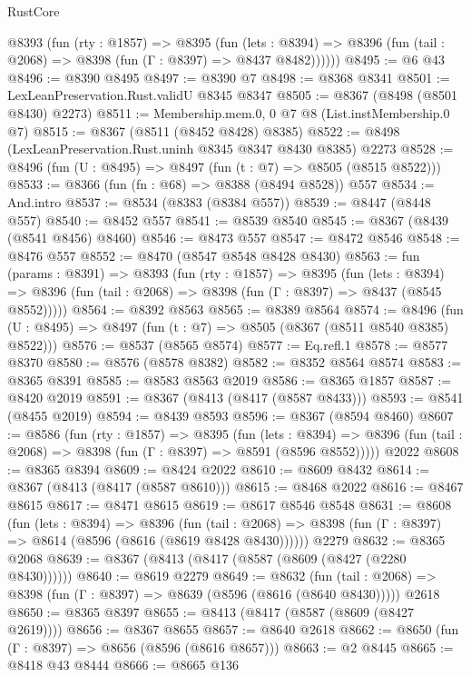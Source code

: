 \begin{lexlean}{RustCore}
\begin{coremodule}
      @8393
        (fun (rty : @1857) =>
        @8395
          (fun (lets : @8394) =>
          @8396 (fun (tail : @2068) => @8398 (fun (Γ : @8397) => @8437 @8482))))))
@8495 := @6 @43
@8496 := @8390 @8495
@8497 := @8390 @7
@8498 := @8368 @8341
@8501 := LexLeanPreservation.Rust.validU @8345 @8347
@8505 := @8367 (@8498 (@8501 @8430) @2273)
@8511 := Membership.mem.{0, 0} @7 @8 (List.instMembership.{0} @7)
@8515 := @8367 (@8511 (@8452 @8428) @8385)
@8522 := @8498 (LexLeanPreservation.Rust.uninh @8345 @8347 @8430 @8385) @2273
@8528 := @8496 (fun (U : @8495) => @8497 (fun (t : @7) => @8505 (@8515 @8522)))
@8533 := @8366 (fun (fn : @68) => @8388 (@8494 @8528)) @557
@8534 := And.intro
@8537 := @8534 (@8383 (@8384 @557))
@8539 := @8447 (@8448 @557)
@8540 := @8452 @557
@8541 := @8539 @8540
@8545 := @8367 (@8439 (@8541 @8456) @8460)
@8546 := @8473 @557
@8547 := @8472 @8546
@8548 := @8476 @557
@8552 := @8470 (@8547 @8548 @8428 @8430)
@8563 := fun (params : @8391) =>
  @8393
    (fun (rty : @1857) =>
    @8395
      (fun (lets : @8394) =>
      @8396 (fun (tail : @2068) => @8398 (fun (Γ : @8397) => @8437 (@8545 @8552)))))
@8564 := @8392 @8563
@8565 := @8389 @8564
@8574 := @8496 (fun (U : @8495) => @8497 (fun (t : @7) => @8505 (@8367 (@8511 @8540 @8385) @8522)))
@8576 := @8537 (@8565 @8574)
@8577 := Eq.refl.{1}
@8578 := @8577 @8370
@8580 := @8576 (@8578 @8382)
@8582 := @8352 @8564 @8574
@8583 := @8365 @8391
@8585 := @8583 @8563 @2019
@8586 := @8365 @1857
@8587 := @8420 @2019
@8591 := @8367 (@8413 (@8417 (@8587 @8433)))
@8593 := @8541 (@8455 @2019)
@8594 := @8439 @8593
@8596 := @8367 (@8594 @8460)
@8607 := @8586
    (fun (rty : @1857) =>
    @8395
      (fun (lets : @8394) =>
      @8396 (fun (tail : @2068) => @8398 (fun (Γ : @8397) => @8591 (@8596 @8552)))))
    @2022
@8608 := @8365 @8394
@8609 := @8424 @2022
@8610 := @8609 @8432
@8614 := @8367 (@8413 (@8417 (@8587 @8610)))
@8615 := @8468 @2022
@8616 := @8467 @8615
@8617 := @8471 @8615
@8619 := @8617 @8546 @8548
@8631 := @8608
    (fun (lets : @8394) =>
    @8396
      (fun (tail : @2068) => @8398 (fun (Γ : @8397) => @8614 (@8596 (@8616 (@8619 @8428 @8430))))))
    @2279
@8632 := @8365 @2068
@8639 := @8367 (@8413 (@8417 (@8587 (@8609 (@8427 (@2280 @8430))))))
@8640 := @8619 @2279
@8649 := @8632
    (fun (tail : @2068) => @8398 (fun (Γ : @8397) => @8639 (@8596 (@8616 (@8640 @8430)))))
    @2618
@8650 := @8365 @8397
@8655 := @8413 (@8417 (@8587 (@8609 (@8427 @2619))))
@8656 := @8367 @8655
@8657 := @8640 @2618
@8662 := @8650 (fun (Γ : @8397) => @8656 (@8596 (@8616 @8657)))
@8663 := @2 @8445
@8665 := @8418 @43 @8444
@8666 := @8665 @136

\end{coremodule}
\end{lexlean}
